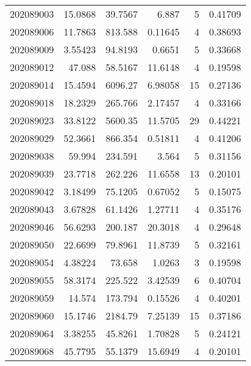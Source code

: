 \begin{tabular}{rrrrrr}
 202089003 &         15.0868  &       39.7567 &            6.887   &           5 & 0.41709 \\
 202089006 &         11.7863  &      813.588  &            0.11645 &           4 & 0.38693 \\
 202089009 &          3.55423 &       94.8193 &            0.6651  &           5 & 0.33668 \\
 202089012 &         47.088   &       58.5167 &           11.6148  &           4 & 0.19598 \\
 202089014 &         15.4594  &     6096.27   &            6.98058 &          15 & 0.27136 \\
 202089018 &         18.2329  &      265.766  &            2.17457 &           4 & 0.33166 \\
 202089023 &         33.8122  &     5600.35   &           11.5705  &          29 & 0.44221 \\
 202089029 &         52.3661  &      866.354  &            0.51811 &           4 & 0.41206 \\
 202089038 &         59.994   &      234.591  &            3.564   &           5 & 0.31156 \\
 202089039 &         23.7718  &      262.226  &           11.6558  &          13 & 0.20101 \\
 202089042 &          3.18499 &       75.1205 &            0.67052 &           5 & 0.15075 \\
 202089043 &          3.67828 &       61.1426 &            1.27711 &           4 & 0.35176 \\
 202089046 &         56.6293  &      200.187  &           20.3018  &           4 & 0.29648 \\
 202089050 &         22.6699  &       79.8961 &           11.8739  &           5 & 0.32161 \\
 202089054 &          4.38224 &       73.658  &            1.0263  &           3 & 0.19598 \\
 202089055 &         58.3174  &      225.522  &            3.42539 &           6 & 0.40704 \\
 202089059 &         14.574   &      173.794  &            0.15526 &           4 & 0.40201 \\
 202089060 &         15.1746  &     2184.79   &            7.25139 &          15 & 0.37186 \\
 202089064 &          3.38255 &       45.8261 &            1.70828 &           5 & 0.24121 \\
 202089068 &         45.7795  &       55.1379 &           15.6949  &           4 & 0.20101 \\

\end{tabular}
